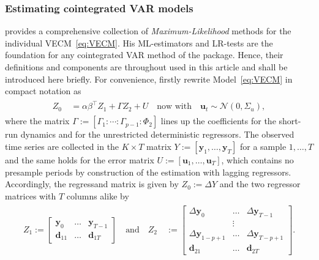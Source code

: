 \subsubsection{Estimating cointegrated VAR models} \label{sec:IndivEst}
\citet{Johansen1991,Johansen1996} provides a comprehensive collection of \textit{Maximum-Likelihood} methods for the individual VECM~\eqref{eq:VECM}. His ML-estimators and LR-tests are the foundation for any cointegrated VAR method of the  package. Hence, their definitions and components are throughout used in this article and shall be introduced here briefly. For convenience, firstly rewrite Model~\eqref{eq:VECM} in compact notation as
\begin{align} \label{eq:compactVECM}
\begin{split}
	Z_{0} \ & = \alpha\beta^\top Z_{1} + \Gamma Z_{2} + U \quad \text{now with} \quad \boldsymbol{u}_{t} \sim \mathcal{N}(0,\Sigma_u),
\end{split}
\end{align}
where the matrix $ \Gamma := \left[ \Gamma_1 : \cdots : \Gamma_{p-1} : \Phi_2 \right] $ lines up the coefficients for the short-run dynamics and for the unrestricted deterministic regressors. The observed time series are collected in the $ K \times T $ matrix $ Y := \left[ \boldsymbol{y}_{1}, \ldots, \boldsymbol{y}_{T} \right] $ for a sample $ 1,\ldots,T $ and the same holds for the error matrix $ U := \left[ \boldsymbol{u}_{1}, \ldots, \boldsymbol{u}_{T} \right] $, which contains no presample periods by construction of the estimation with lagging regressors. Accordingly, the regressand matrix is given by $Z_0 := \Delta Y $ and the two regressor matrices with $ T $ columns alike by
\begin{align} \label{eq:compactRegressor}
\begin{split}
	Z_1 := 
	\begin{bmatrix} 
		\boldsymbol{y}_{0}  & \ldots & \boldsymbol{y}_{T-1} \\ 
		\boldsymbol{d}_{11} & \ldots & \boldsymbol{d}_{1T} 
	\end{bmatrix}
	\quad \text{and} \quad
	Z_{2} \ & := 
	\begin{bmatrix}
		\Delta \boldsymbol{y}_{0}     & \ldots & \Delta \boldsymbol{y}_{T-1} \\
		                              & \vdots &                             \\
		\Delta \boldsymbol{y}_{1-p+1} & \ldots & \Delta \boldsymbol{y}_{T-p+1} \\
		\boldsymbol{d}_{21}           & \ldots & \boldsymbol{d}_{2T}
	\end{bmatrix}.
\end{split}
\end{align} 
